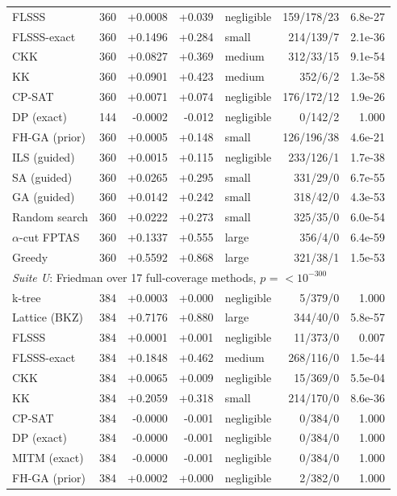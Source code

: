 \begin{table}[htbp]
\begin{tabular}{lrrrlrr}
FLSSS & 360 & +0.0008 & +0.039 & negligible & 159/178/23 & 6.8e-27 \\
FLSSS-exact & 360 & +0.1496 & +0.284 & small & 214/139/7 & 2.1e-36 \\
CKK & 360 & +0.0827 & +0.369 & medium & 312/33/15 & 9.1e-54 \\
KK & 360 & +0.0901 & +0.423 & medium & 352/6/2 & 1.3e-58 \\
CP-SAT & 360 & +0.0071 & +0.074 & negligible & 176/172/12 & 1.9e-26 \\
DP (exact) & 144 & -0.0002 & -0.012 & negligible & 0/142/2 & 1.000 \\
FH-GA (prior) & 360 & +0.0005 & +0.148 & small & 126/196/38 & 4.6e-21 \\
ILS (guided) & 360 & +0.0015 & +0.115 & negligible & 233/126/1 & 1.7e-38 \\
SA (guided) & 360 & +0.0265 & +0.295 & small & 331/29/0 & 6.7e-55 \\
GA (guided) & 360 & +0.0142 & +0.242 & small & 318/42/0 & 4.3e-53 \\
Random search & 360 & +0.0222 & +0.273 & small & 325/35/0 & 6.0e-54 \\
$\alpha$-cut FPTAS & 360 & +0.1337 & +0.555 & large & 356/4/0 & 6.4e-59 \\
Greedy & 360 & +0.5592 & +0.868 & large & 321/38/1 & 1.5e-53 \\
\midrule
\multicolumn{7}{l}{\emph{Suite U}: Friedman over 17 full-coverage methods, $p$ = $<10^{-300}$} \\
k-tree & 384 & +0.0003 & +0.000 & negligible & 5/379/0 & 1.000 \\
Lattice (BKZ) & 384 & +0.7176 & +0.880 & large & 344/40/0 & 5.8e-57 \\
FLSSS & 384 & +0.0001 & +0.001 & negligible & 11/373/0 & 0.007 \\
FLSSS-exact & 384 & +0.1848 & +0.462 & medium & 268/116/0 & 1.5e-44 \\
CKK & 384 & +0.0065 & +0.009 & negligible & 15/369/0 & 5.5e-04 \\
KK & 384 & +0.2059 & +0.318 & small & 214/170/0 & 8.6e-36 \\
CP-SAT & 384 & -0.0000 & -0.001 & negligible & 0/384/0 & 1.000 \\
DP (exact) & 384 & -0.0000 & -0.001 & negligible & 0/384/0 & 1.000 \\
MITM (exact) & 384 & -0.0000 & -0.001 & negligible & 0/384/0 & 1.000 \\
FH-GA (prior) & 384 & +0.0002 & +0.000 & negligible & 2/382/0 & 1.000 \\

\end{tabular}
\end{table}
